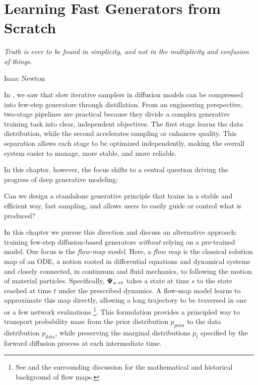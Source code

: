 \chapter{Learning Fast Generators from Scratch}\label{ch:fast-scratch}

\epigraph{
    \textit{Truth is ever to be found in simplicity, and not in the multiplicity and confusion of things.
}}{Isaac Newton}


In , we saw that slow iterative samplers in diffusion models can be compressed into few-step generators through distillation. From an engineering perspective, two-stage pipelines are practical because they divide a complex generative training task into clear, independent objectives. The first stage learns the data distribution, while the second accelerates sampling or enhances quality. This separation allows each stage to be optimized independently, making the overall system easier to manage, more stable, and more reliable.

In this chapter, however, the focus shifts to a central question driving the progress of deep generative modeling:
\begin{question}
    Can we design a standalone generative principle that trains in a stable and efficient way, fast sampling, and allows users to easily guide or control what is produced?
\end{question}
In this chapter we pursue this direction and discuss an alternative approach:
training few-step diffusion-based generators \emph{without} relying on a pre-trained model.
Our focus is the \emph{flow-map model}. Here, a \emph{flow map} is the
classical solution map of an ODE, a notion rooted in differential
equations and dynamical systems and closely connected, in continuum and
fluid mechanics, to following the motion of material particles.
Specifically, ${\bm{\Psi}}_{s\to t}$ takes a state at time $s$ to the state
reached at time $t$ under the prescribed dynamics. A flow-map model
learns to approximate this map directly, allowing a long trajectory to
be traversed in one or a few network evaluations%
\footnote{See  and the surrounding discussion for
the mathematical and historical background of flow maps.}.
This formulation provides a principled way to transport probability mass from the prior distribution $p_{\mathrm{prior}}$ to the data distribution $p_{\mathrm{data}}$,
while preserving the marginal distributions $p_t$ specified by the forward diffusion process at each intermediate time.


